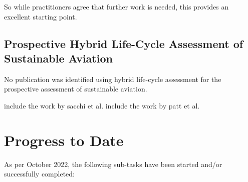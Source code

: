 \documentclass{article}
\begin{document}
        So while practitioners agree that further work is needed, this provides an excellent starting point.

    \subsection{Prospective Hybrid Life-Cycle Assessment of Sustainable Aviation}
    
        No publication was identified using hybrid life-cycle assessment for the prospective assessment of sustainable aviation.
        
        include the work by sacchi et al.
        include the work by patt et al.
        

\newpage
\section{Progress to Date}

    As per October 2022, the following sub-tasks have been started and/or successfully completed:
    
\end{document}
